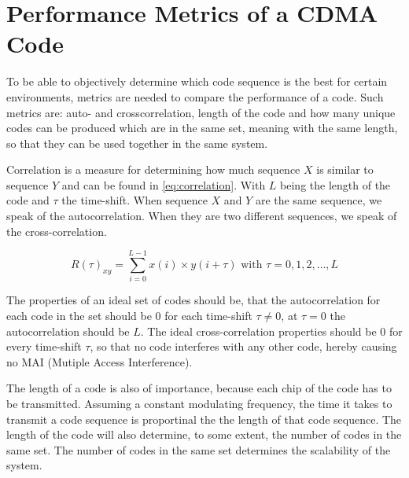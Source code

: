
\section{Performance Metrics of a CDMA Code}
\label{sec:performance-metrics-cdma}

To be able to objectively determine which code sequence is the best for certain environments, metrics are needed to compare the performance of a code.
Such metrics are: auto- and crosscorrelation, length of the code and how many unique codes can be produced which are in the same set, meaning with the same length, so that they can be used together in the same system.



Correlation is a measure for determining how much sequence $X$ is similar to sequence $Y$ and can be found in \autoref{eq:correlation}.
With $L$ being the length of the code and $\tau$ the time-shift.
When sequence $X$ and $Y$ are the same sequence, we speak of the autocorrelation.
When they are two different sequences, we speak of the cross-correlation. 

\begin{equation}
	R(\tau)_{xy} = \displaystyle\sum_{i = 0} ^ {L - 1} x(i) \times y(i + \tau) {\text{  with $\tau = 0, 1, 2, \dotsc, L$}}
	\label{eq:correlation}
\end{equation}








The properties of an ideal set of codes should be, that the autocorrelation for each code in the set should be $0$ for each time-shift $\tau \neq 0$, at $\tau = 0$ the autocorrelation should be $L$.
The ideal cross-correlation properties should be $0$ for every time-shift $\tau$, so that no code interferes with any other code, hereby causing no MAI (Mutiple Access Interference).



The length of a code is also of importance, because each chip of the code has to be transmitted.
Assuming a constant modulating frequency, the time it takes to transmit a code sequence is proportinal the the length of that code sequence.
The length of the code will also determine, to some extent, the number of codes in the same set.
The number of codes in the same set determines the scalability of the system.




